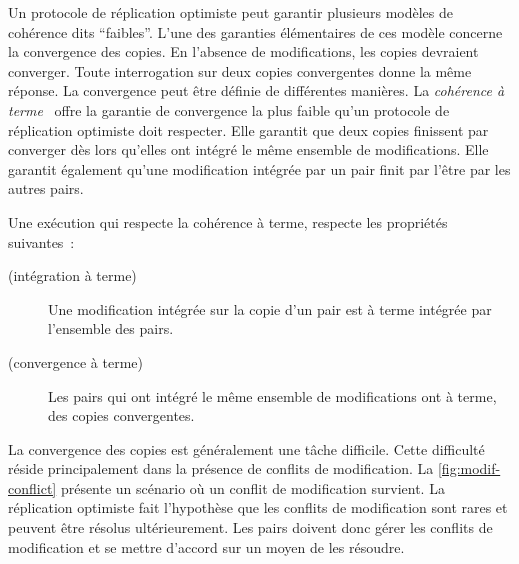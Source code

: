 Un protocole de réplication optimiste peut garantir plusieurs modèles de cohérence dits \enquote{faibles}.
L'une des garanties élémentaires de ces modèle concerne la convergence des copies.
En l'absence de modifications, les copies devraient converger.
Toute interrogation sur deux copies convergentes donne la même réponse.
La convergence peut être définie de différentes manières.
La \emph{cohérence à terme}~\autocite{terry_sessionguarentees_1994,saito_2005_optimisticreplication, vogels_eventuallyconsistent_2009} offre la garantie de convergence la plus faible qu'un protocole de réplication optimiste doit respecter.
Elle garantit que deux copies finissent par converger dès lors qu'elles ont intégré le même ensemble de modifications.
Elle garantit également qu'une modification intégrée par un pair finit par l'être par les autres pairs.

\begin{definition}\label{def:eventual-consistency}
  Une exécution qui respecte la cohérence à terme, respecte les propriétés suivantes~:
  \begin{description}
  \item[ (intégration à terme)] Une modification intégrée sur la copie d'un pair est à terme intégrée par l'ensemble des pairs.
  \item[ (convergence à terme)] Les pairs qui ont intégré le même ensemble de modifications ont à terme, des copies convergentes.
  \end{description}
\end{definition}

La convergence des copies est généralement une tâche difficile.
Cette difficulté réside principalement dans la présence de conflits de modification.
La \autoref{fig:modif-conflict} présente un scénario où un conflit de modification survient.
La réplication optimiste fait l'hypothèse  que les conflits de modification sont rares et peuvent être résolus ultérieurement.
Les pairs doivent donc gérer les conflits de modification et se mettre d'accord sur un moyen de les résoudre.


